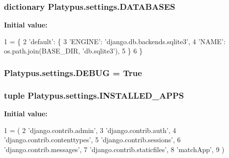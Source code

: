 \subsubsection[{D\+A\+T\+A\+B\+A\+S\+E\+S}]{\setlength{\rightskip}{0pt plus 5cm}dictionary Platypus.\+settings.\+D\+A\+T\+A\+B\+A\+S\+E\+S}\label{namespace_platypus_1_1settings_a52c253859b1798aee0972f29f3c94f00}
{\bfseries Initial value\+:}
\begin{DoxyCode}
1 = \{
2     \textcolor{stringliteral}{'default'}: \{
3         \textcolor{stringliteral}{'ENGINE'}: \textcolor{stringliteral}{'django.db.backends.sqlite3'},
4         \textcolor{stringliteral}{'NAME'}: os.path.join(BASE\_DIR, \textcolor{stringliteral}{'db.sqlite3'}),
5     \}
6 \}
\end{DoxyCode}
\hypertarget{namespace_platypus_1_1settings_a805959f406c1ab783912dca1bf4f9b4d}{}
\subsubsection[{D\+E\+B\+U\+G}]{\setlength{\rightskip}{0pt plus 5cm}Platypus.\+settings.\+D\+E\+B\+U\+G = True}\label{namespace_platypus_1_1settings_a805959f406c1ab783912dca1bf4f9b4d}
\hypertarget{namespace_platypus_1_1settings_a987c3c31e79426162bba4a525f150839}{}
\subsubsection[{I\+N\+S\+T\+A\+L\+L\+E\+D\+\_\+\+A\+P\+P\+S}]{\setlength{\rightskip}{0pt plus 5cm}tuple Platypus.\+settings.\+I\+N\+S\+T\+A\+L\+L\+E\+D\+\_\+\+A\+P\+P\+S}\label{namespace_platypus_1_1settings_a987c3c31e79426162bba4a525f150839}
{\bfseries Initial value\+:}
\begin{DoxyCode}
1 = (
2     \textcolor{stringliteral}{'django.contrib.admin'},
3     \textcolor{stringliteral}{'django.contrib.auth'},
4     \textcolor{stringliteral}{'django.contrib.contenttypes'},
5     \textcolor{stringliteral}{'django.contrib.sessions'},
6     \textcolor{stringliteral}{'django.contrib.messages'},
7     \textcolor{stringliteral}{'django.contrib.staticfiles'},
8     \textcolor{stringliteral}{'matchApp'},
9 )
\end{DoxyCode}
\hypertarget{namespace_platypus_1_1settings_a0cb66ded6846c00b50227be07adf9ace}{}
